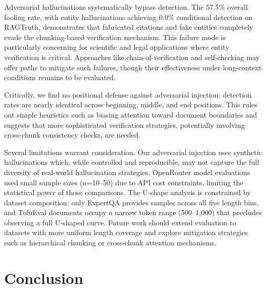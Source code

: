 \documentclass{article}
\begin{document}
Adversarial hallucinations systematically bypass detection. The 57.5\% overall fooling rate, with entity hallucinations achieving 0.0\% conditional detection on RAGTruth, demonstrates that fabricated citations and fake entities completely evade the chunking-based verification mechanism. This failure mode is particularly concerning for scientific and legal applications where entity verification is critical. Approaches like chain-of-verification \citep{dhuliawala2023chain} and self-checking \citep{li2023self} may offer paths to mitigate such failures, though their effectiveness under long-context conditions remains to be evaluated.

Critically, we find no positional defense against adversarial injection: detection rates are nearly identical across beginning, middle, and end positions. This rules out simple heuristics such as biasing attention toward document boundaries and suggests that more sophisticated verification strategies, potentially involving cross-chunk consistency checks, are needed.

Several limitations warrant consideration. Our adversarial injection uses synthetic hallucinations which, while controlled and reproducible, may not capture the full diversity of real-world hallucination strategies. OpenRouter model evaluations used small sample sizes (n=10--50) due to API cost constraints, limiting the statistical power of those comparisons. The U-shape analysis is constrained by dataset composition: only ExpertQA provides samples across all five length bins, and TofuEval documents occupy a narrow token range (500--1,000) that precludes observing a full U-shaped curve. Future work should extend evaluation to datasets with more uniform length coverage and explore mitigation strategies such as hierarchical chunking or cross-chunk attention mechanisms.

\section{Conclusion}
\end{document}
